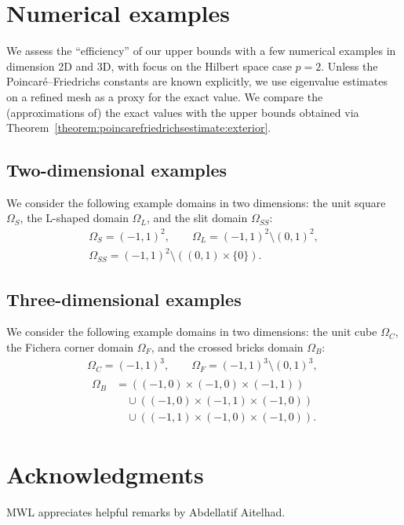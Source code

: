 \documentclass[10pt,letterpaper]{article}
\begin{document}
\section{Numerical examples}\label{section:numericalexamples}

We assess the ``efficiency'' of our upper bounds with a few numerical examples in dimension 2D and 3D, with focus on the Hilbert space case $p=2$. 
Unless the Poincar\'e--Friedrichs constants are known explicitly, we use eigenvalue estimates on a refined mesh as a proxy for the exact value. We compare the (approximations of) the exact values with the upper bounds obtained via Theorem~\ref{theorem:poincarefriedrichsestimate:exterior}.

\subsection{Two-dimensional examples}

We consider the following example domains in two dimensions:
the unit square $\Omega_S$, the L-shaped domain $\Omega_L$, and the slit domain $\Omega_{SS}$:
\begin{gather*}
    \Omega_{S}  = (-1,1)^2,
    \qquad 
    \Omega_{L}  = (-1,1)^2 \setminus (0,1)^2,
    \\
    \Omega_{SS} = (-1,1)^2 \setminus ( (0,1) \times \{0\} ).
\end{gather*}

\subsection{Three-dimensional examples}

We consider the following example domains in two dimensions:
the unit cube $\Omega_C$, the Fichera corner domain $\Omega_F$, and the crossed bricks domain $\Omega_{B}$:
\begin{gather*}
    \Omega_{C}  = (-1,1)^3,
    \qquad 
    \Omega_{F}  = (-1,1)^3 \setminus (0,1)^3,
    \\
    \begin{aligned}
    \Omega_{B} &= 
    \left( (-1,0) \times (-1,0) \times (-1,1) \right)
    \\&\quad
    \cup 
    \left( (-1,0) \times (-1,1) \times (-1,0) \right)
    \\&\quad
    \cup 
    \left( (-1,1) \times (-1,0) \times (-1,0) \right)
    .
    \end{aligned}
\end{gather*}











\section*{Acknowledgments}

MWL appreciates helpful remarks by Abdellatif Aitelhad.



\end{document}
